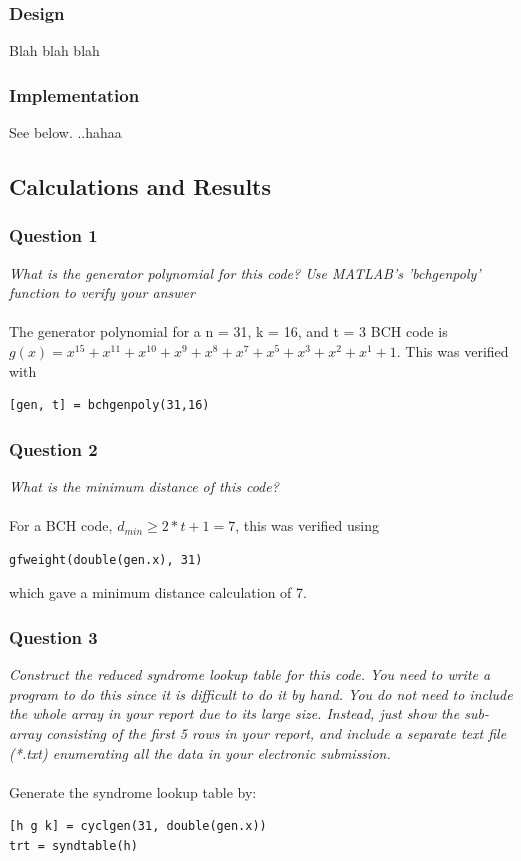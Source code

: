 \documentclass[a4paper]{article}
\begin{document}
\subsubsection{Design}

 Blah blah blah \\
 
\subsubsection{Implementation}

See below. ..hahaa \\
 
\subsection{Calculations and Results}

\subsubsection{Question 1} \textit{What is the generator polynomial for this code? Use MATLAB’s ’bchgenpoly’ function to verify your answer} \\
\\
The generator polynomial for a n = 31, k = 16, and t = 3 BCH code is $g(x) = x^{15} + x^{11} + 
x^{10} + x^{9} + x^{8} + x^{7} + x^{5} + x^{3} + x^{2} + x^{1} + 1$. 
This was verified with 
\begin{lstlisting}
[gen, t] = bchgenpoly(31,16)
\end{lstlisting}

\subsubsection{Question 2} \textit{What is the minimum distance of this code?} \\
\\
For a BCH code, $d_{min} \geq 2*t + 1 = 7$, this was verified using 
\begin{lstlisting}
gfweight(double(gen.x), 31)
\end{lstlisting}
which gave a minimum distance calculation of 7.

\subsubsection{Question 3} \textit{Construct the reduced syndrome lookup table for this code. You need to write a program to do this since it is difficult to do it by hand. You do not need to include the whole array in your report due to its large size. Instead, just show the sub-array consisting of the first 5 rows in your report, and include a separate text file (*.txt) enumerating all the data in your electronic submission.} \\
\\
Generate the syndrome lookup table by:
\begin{lstlisting}
[h g k] = cyclgen(31, double(gen.x))
trt = syndtable(h)
\end{lstlisting}
\end{document}

